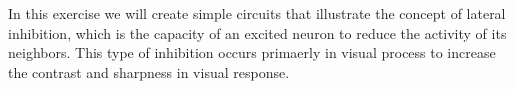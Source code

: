\begin{Exercise}
In this exercise we will create simple circuits that illustrate the concept of lateral inhibition, which is the 
capacity of an excited neuron to reduce the activity of its neighbors. This type of inhibition occurs primaerly in 
visual process to increase the contrast and sharpness in visual response.

\end{Exercise}